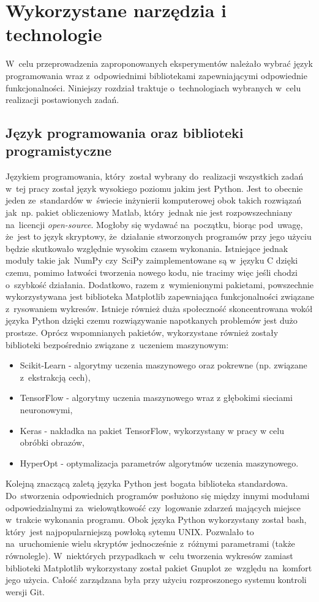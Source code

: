 \section{Wykorzystane narzędzia i technologie} \label{tools}
W~celu przeprowadzenia zaproponowanych eksperymentów należało wybrać język programowania wraz z~odpowiednimi bibliotekami zapewniającymi odpowiednie funkcjonalności. Niniejszy rozdział traktuje o~technologiach wybranych w~celu realizacji postawionych zadań.
\subsection{Język programowania oraz biblioteki programistyczne}
Językiem programowania, który~został wybrany do~realizacji wszystkich zadań w~tej pracy został język wysokiego poziomu jakim jest Python. Jest to obecnie jeden ze~standardów w~świecie inżynierii komputerowej obok takich rozwiązań jak~np. pakiet obliczeniowy Matlab, który~jednak nie jest rozpowszechniany na~licencji \textit{open-source}. Mogłoby się wydawać na~początku, biorąc pod~uwagę, że~jest to język skryptowy, że~działanie stworzonych programów przy jego użyciu będzie skutkowało względnie wysokim czasem wykonania. Istniejące jednak moduły takie jak~NumPy czy~SciPy\cite{scipy} zaimplementowane są w~języku C dzięki czemu, pomimo łatwości tworzenia nowego kodu, nie tracimy więc jeśli chodzi o~szybkość działania. Dodatkowo, razem z~wymienionymi pakietami, powszechnie wykorzystywana jest biblioteka Matplotlib\cite{matplotlib} zapewniająca funkcjonalności związane z~rysowaniem wykresów. Istnieje również duża społeczność skoncentrowana wokół języka Python dzięki czemu rozwiązywanie napotkanych problemów jest dużo prostsze. Oprócz wspomnianych pakietów, wykorzystane również zostały biblioteki bezpośrednio związane z~uczeniem maszynowym:
\begin{itemize}
\item Scikit-Learn\cite{scikit} - algorytmy uczenia maszynowego oraz pokrewne (np. związane z~ekstrakcją cech),
\item TensorFlow\cite{tensorflow} - algorytmy uczenia maszynowego wraz z głębokimi sieciami neuronowymi,
\item Keras\cite{keras} - nakładka na pakiet TensorFlow, wykorzystany w pracy w celu obróbki obrazów,
\item HyperOpt\cite{hyperopt} - optymalizacja parametrów algorytmów uczenia maszynowego.
\end{itemize}
Kolejną znaczącą zaletą języka Python jest bogata biblioteka standardowa. Do~stworzenia odpowiednich programów posłużono się między innymi modułami odpowiedzialnymi za~wielowątkowość czy~logowanie zdarzeń mających miejsce w~trakcie wykonania programu. Obok języka Python wykorzystany został bash, który~jest najpopularniejszą powłoką sytemu UNIX. Pozwalało to na~uruchomienie wielu skryptów jednocześnie z~różnymi parametrami (także równolegle). W~niektórych przypadkach w~celu tworzenia wykresów zamiast biblioteki Matplotlib wykorzystany został pakiet Gnuplot ze~względu na~komfort jego użycia. Całość zarządzana była przy użyciu rozproszonego systemu kontroli wersji Git.


